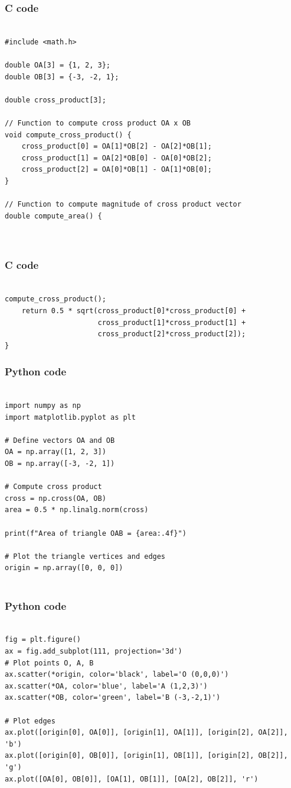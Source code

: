 \documentclass{beamer}
\begin{document}
\begin{frame}[fragile]
\frametitle{C code}
\begin{lstlisting}

#include <math.h>

double OA[3] = {1, 2, 3};
double OB[3] = {-3, -2, 1};

double cross_product[3];

// Function to compute cross product OA x OB
void compute_cross_product() {
    cross_product[0] = OA[1]*OB[2] - OA[2]*OB[1];
    cross_product[1] = OA[2]*OB[0] - OA[0]*OB[2];
    cross_product[2] = OA[0]*OB[1] - OA[1]*OB[0];
}

// Function to compute magnitude of cross product vector
double compute_area() {



\end{lstlisting}
\end{frame}


\begin{frame}[fragile]
\frametitle{C code}
\begin{lstlisting}

compute_cross_product();
    return 0.5 * sqrt(cross_product[0]*cross_product[0] +
                      cross_product[1]*cross_product[1] +
                      cross_product[2]*cross_product[2]);
}

\end{lstlisting}
\end{frame}

\begin{frame}[fragile]
\frametitle{Python code}
\begin{lstlisting}

import numpy as np
import matplotlib.pyplot as plt

# Define vectors OA and OB
OA = np.array([1, 2, 3])
OB = np.array([-3, -2, 1])

# Compute cross product
cross = np.cross(OA, OB)
area = 0.5 * np.linalg.norm(cross)

print(f"Area of triangle OAB = {area:.4f}")

# Plot the triangle vertices and edges
origin = np.array([0, 0, 0])


\end{lstlisting}
\end{frame}


\begin{frame}[fragile]
\frametitle{Python code}
\begin{lstlisting}

fig = plt.figure()
ax = fig.add_subplot(111, projection='3d')
# Plot points O, A, B
ax.scatter(*origin, color='black', label='O (0,0,0)')
ax.scatter(*OA, color='blue', label='A (1,2,3)')
ax.scatter(*OB, color='green', label='B (-3,-2,1)')

# Plot edges
ax.plot([origin[0], OA[0]], [origin[1], OA[1]], [origin[2], OA[2]], 'b')
ax.plot([origin[0], OB[0]], [origin[1], OB[1]], [origin[2], OB[2]], 'g')
ax.plot([OA[0], OB[0]], [OA[1], OB[1]], [OA[2], OB[2]], 'r')


\end{lstlisting}
\end{frame}
\end{document}
